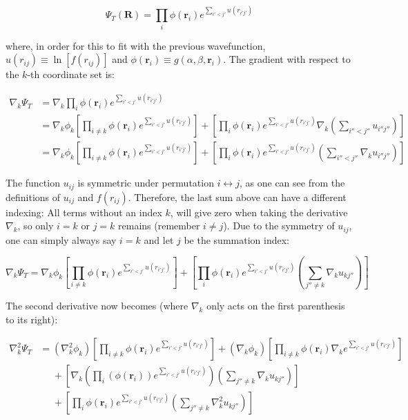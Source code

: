 \documentclass[english, a4paper]{article}
\newcommand{\bm}[1]{\mathbf{#1}}
\begin{document}
\begin{equation}
	\Psi_T(\bm{R}) = \prod_{i} \phi(\bm{r}_i)e^{\sum_{i'<j'}u(r_{i'j'})}
\end{equation}

where, in order for this to fit with the previous wavefunction, $u(r_{ij}) \equiv \ln[f(r_{ij})]$ and $\phi(\bm{r}_i) \equiv g(\alpha,\beta,\bm{r}_i)$. The gradient with respect to the $k$-th coordinate set is:

\begin{align}
	\nabla_k\Psi_T &= \nabla_k\prod_i \phi(\bm{r}_i)e^{\sum_{i'<j'}u(r_{i'j'})}\\
	&= \nabla_k\phi_k\left[\prod_{i\neq k} \phi(\bm{r}_i)e^{\sum_{i'<j'}u(r_{i'j'})}\right] + \left[\prod_i \phi(\bm{r}_i)e^{\sum_{i'<j'}u(r_{i'j'})}\nabla_k\left(\sum_{i''<j''}u_{i''j''} \right)\right]\\
	&= \nabla_k\phi_k\left[\prod_{i\neq k} \phi(\bm{r}_i)e^{\sum_{i'<j'}u(r_{i'j'})}\right] + \left[\prod_i \phi(\bm{r}_i)e^{\sum_{i'<j'}u(r_{i'j'})}\left(\sum_{i''<j''}\nabla_ku_{i''j''} \right)\right]
\end{align}

The function $u_{ij}$ is symmetric under permutation $i \leftrightarrow j$, as one can see from the definitions of $u_{ij}$ and $f(r_{ij})$. Therefore, the last sum above can have a different indexing: All terms without an index $k$, will give zero when taking the derivative $\nabla_k$, so only $i=k$ or $j=k$ remains (remember $i \neq j$). Due to the symmetry of $u_{ij}$, one can simply always say $i=k$ and let $j$ be the summation index:

\begin{equation}
	\nabla_k\Psi_T = \nabla_k\phi_k\left[\prod_{i\neq k} \phi(\bm{r}_i)e^{\sum_{i'<j'}u(r_{i'j'})}\right] + \left[\prod_i \phi(\bm{r}_i)e^{\sum_{i'<j'}u(r_{i'j'})}\left(\sum_{j''\neq k}\nabla_ku_{kj''} \right)\right]
	\label{eq:grad}
\end{equation}

The second derivative now becomes (where $\nabla_k$ only acts on the first parenthesis to its right):

\begin{align*}
	\nabla_k^2\Psi_T &= (\nabla_k^2\phi_k)\left[\prod_{i\neq k} \phi(\bm{r}_i)e^{\sum_{i'<j'}u(r_{i'j'})}\right] + (\nabla_k\phi_k) \left[\prod_{i\neq k}\phi(\bm{r}_i)\nabla_ke^{\sum_{i'<j'}u(r_{i'j'})}\right]\\
	&\:\:\:\:\:\: + \left[\nabla_k\left(\prod_i \left(\phi(\bm{r}_i)\right)e^{\sum_{i'<j'}u(r_{i'j'})}\right)\left(\sum_{j''\neq k}\nabla_ku_{kj''} \right)\right]\\
	&\:\:\:\:\:\: + \left[\prod_i \phi(\bm{r}_i)e^{\sum_{i'<j'}u(r_{i'j'})}\left(\sum_{j''\neq k}\nabla_k^2u_{kj''} \right)\right]
\end{align*}
\end{document}
